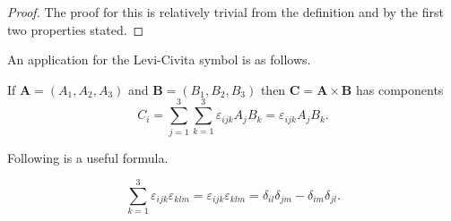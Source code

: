 \begin{proof}
    The proof for this is relatively trivial from the definition and by the first two properties stated.
\end{proof}

An application for the Levi-Civita symbol is as follows.

\begin{proposition}
    If $\bm A = (A_1, A_2, A_3)$ and $\bm B = (B_1, B_2, B_3)$ then $\bm C = \bm A \times \bm B$ has components
    \[ C_i = \sum_{j = 1}^3\sum_{k = 1}^3 \varepsilon_{ijk}A_jB_k = \varepsilon_{ijk}A_jB_k. \]
\end{proposition}

Following is a useful formula.

\begin{proposition}
    \[ \sum_{k = 1}^3 \varepsilon_{ijk}\varepsilon_{klm} = \varepsilon_{ijk}\varepsilon_{klm} = \delta_{il}\delta_{jm} - \delta_{im}\delta_{jl}. \]    
\end{proposition}
